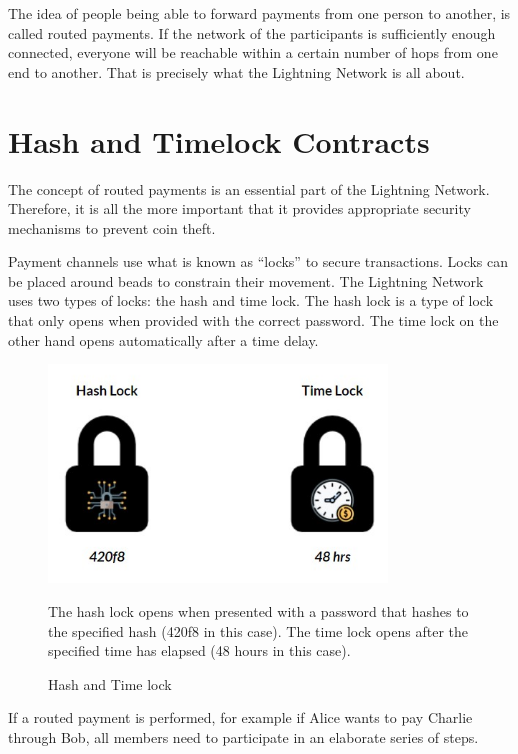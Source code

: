 \documentclass[a4paper, 12pt]{report}
\begin{document}
\par The idea of people being able to forward payments from one person to another, is called routed payments. If the network of the participants is sufficiently enough connected, everyone will be reachable within a certain number of hops from one end to another. That is precisely what the Lightning Network is all about.

\section{Hash and Timelock Contracts}
\par The concept of routed payments is an essential part of the Lightning Network. Therefore, it is all the more important that it provides appropriate security mechanisms to prevent coin theft.
\par Payment channels use what is known as “locks” to secure transactions. Locks can be placed around beads to constrain their movement. The Lightning Network uses two types of locks: the hash and time lock. The hash lock is a type of lock that only opens when provided with the correct password. The time lock on the other hand opens automatically after a time delay.

\begin{figure}[H]
	\centering
	\includegraphics[width=9cm]{08_Locks}
	\caption{Hash and Time lock}
	\medskip
	\small The hash lock opens when presented with a password that hashes to the specified hash (420f8 in this case). The time lock opens after the specified time has elapsed (48 hours in this case).
	\label{fig:08_Locks}
\end{figure}

\par If a routed payment is performed, for example if Alice wants to pay Charlie through Bob, all members need to participate in an elaborate series of steps.
\end{document}
